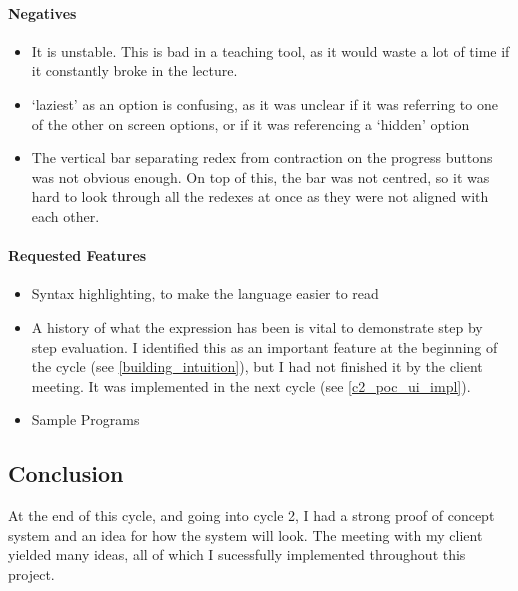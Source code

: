 \paragraph{Negatives}
\begin{itemize}
    \item It is unstable. This is bad in a teaching tool, as it would waste a lot of time if it constantly broke in the lecture. 
    \item `laziest' as an option is confusing, as it was unclear if it was referring to one of the other on screen options, or if it was referencing a `hidden' option
    \item The vertical bar separating redex from contraction on the progress buttons was not obvious enough. On top of this, the bar was not centred, so it was hard to look through all the redexes at once as they were not aligned with each other. 
\end{itemize}

\paragraph{Requested Features}
\begin{itemize}
    \item Syntax highlighting, to make the language easier to read   
    \item A history of what the expression has been is vital to demonstrate step by step evaluation. I identified this as an important feature at the beginning of the cycle (see \ref{building_intuition}), but I had not finished it by the client meeting. It was implemented in the next cycle (see \ref{c2_poc_ui_impl}). 
    \item Sample Programs
\end{itemize}

\subsection{Conclusion}
At the end of this cycle, and going into cycle 2, I had a strong proof of concept system and an idea for how the system will look. The meeting with my client yielded many ideas, all of which I sucessfully implemented throughout this project. 